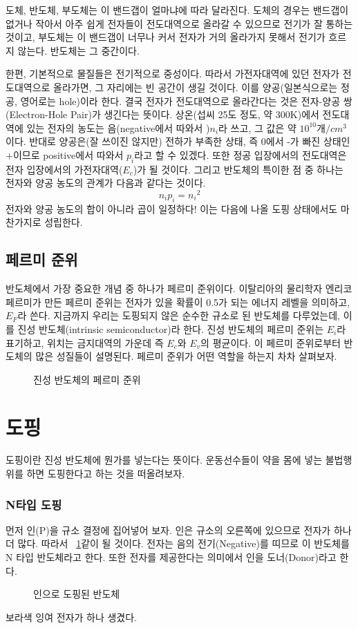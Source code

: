 도체, 반도체, 부도체는 이 밴드갭이 얼마냐에 따라 달라진다. 도체의 경우는 밴드갭이 없거나 작아서 아주 쉽게 전자들이 전도대역으로 올라갈 수 있으므로 전기가 잘 통하는 것이고, 부도체는 이 밴드갭이 너무나 커서 전자가 거의 올라가지 못해서 전기가 흐르지 않는다. 반도체는 그 중간이다.

한편, 기본적으로 물질들은 전기적으로 중성이다. 따라서 가전자대역에 있던 전자가 전도대역으로 올라가면, 그 자리에는 빈 공간이 생길 것이다. 이를 양공(일본식으로는 정공, 영어로는 hole)이라 한다. 결국 전자가 전도대역으로 올라간다는 것은 전자-양공 쌍(Electron-Hole Pair)가 생긴다는 뜻이다.
상온(섭씨 25도 정도, 약 300K)에서 전도대역에 있는 전자의 농도는 음(negative에서 따와서 )$n_i$라 쓰고, 그 값은 약 $10^{10} 개/cm^3$이다. 반대로 양공은(잘 쓰이진 않지만) 전하가 부족한 상태, 즉 0에서 -가 빠진 상태인 +이므로 positive에서 따와서 $p_i$라고 할 수 있겠다.
또한 정공 입장에서의 전도대역은 전자 입장에서의 가전자대역($E_c$)가 될 것이다.
그리고 반도체의 특이한 점 중 하나는 전자와 양공 농도의 관계가 다음과 같다는 것이다.
\begin{equation}
    n_i p_i={n_i}^2\label{eqn:constant concentration product}
\end{equation}
전자와 양공 농도의 합이 아니라 곱이 일정하다! 이는 다음에 나올 도핑 상태에서도 마찬가지로 성립한다.
\subsection{페르미 준위}
반도체에서 가장 중요한 개념 중 하나가 페르미 준위이다. 이탈리아의 물리학자 엔리코 페르미가 만든 페르미 준위는 전자가 있을 확률이 0.5가 되는 에너지 레벨을 의미하고, $E_F$라 쓴다.
지금까지 우리는 도핑되지 않은 순수한 규소로 된 반도체를 다루었는데, 이를 진성 반도체(intrinsic semiconductor)라 한다. 진성 반도체의 페르미 준위는 $E_i$라 표기하고, 위치는 금지대역의 가운데 즉 $E_c$와 $E_v$의 평균이다.
이 페르미 준위로부터 반도체의 많은 성질들이 설명된다. 페르미 준위가 어떤 역할을 하는지 차차 살펴보자.
\begin{figure}[!tbp]
    \centering
    \caption{진성 반도체의 페르미 준위}
\end{figure}
\section{도핑}
도핑이란 진성 반도체에 뭔가를 넣는다는 뜻이다. 운동선수들이 약을 몸에 넣는 불법행위를 하면 도핑한다고 하는 것을 떠올려보자.
\subsubsection{N타입 도핑}
먼저 인(P)을 규소 결정에 집어넣어 보자. 인은 규소의 오른쪽에 있으므로 전자가 하나 더 많다. 따라서 \figurename~\ref{fig:Phosphorus doping}\과 같이 될 것이다.
전자는 음의 전기(Negative)를 띠므로 이 반도체를 N 타입 반도체라고 한다. 또한 전자를 제공한다는 의미에서 인을 도너(Donor)라고 한다.
\begin{figure}[!hbp]
    \centering
    \caption{인으로 도핑된 반도체}\label{fig:Phosphorus doping}
\end{figure}
보라색 잉여 전자가 하나 생겼다. 

